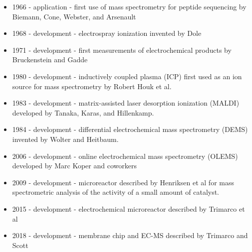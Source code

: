 \begin{itemize}
	\item 1966 - application - first use of mass spectrometry for peptide sequencing by Biemann, Cone, Webster, and Arsenault
	\item 1968 - development - electrospray ionization invented by Dole
	\item 1971 - development - first measurements of electrochemical products by Bruckenstein and Gadde
	\item 1980 - development - inductively coupled plasma (ICP) first used as an ion source for mass spectrometry by Robert Houk et al.
	\item 1983 - development - matrix-assisted laser desorption ionization (MALDI) developed by Tanaka, Karas, and Hillenkamp.
	\item 1984 - development - differential electrochemical mass spectrometry (DEMS) invented by Wolter and Heitbaum. 
	\item 2006 - development - online electrochemical mass spectrometry (OLEMS) developed by Marc Koper and coworkers
	\item 2009 - development - microreactor described by Henriksen et al for mass spectrometric analysis of the activity of a small amount of catalyst.
	\item 2015 - development - electrochemical microreactor described by Trimarco et al
	\item 2018 - development - membrane chip and EC-MS described by Trimarco and Scott
\end{itemize}